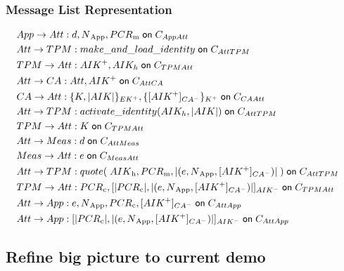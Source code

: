 \documentclass{beamer}
\def \app {App}
\def \att {Att}
\def \ca {CA}
\def \mea {Meas}
\def \tp {TPM}
\def \pmask {PCR\textsubscript{m}}
\def \pcomp {PCR\textsubscript{c}}
\def \evd {d}
\def \eve {e}
\def \cacert {\sign {\public{AIK}}{CA}}
\def \exdata {\hash{(\eve, \nonce{\app}, \cacert ) }}
\def \aikh {AIK_h}
\begin{document}
\begin{frame}
  \frametitle{Message List Representation}
  \begin{small}
  \begin{align*}
  & \sndmsg {\app}{\att} {\evd, \nonce{\app}, \pmask} {\channel {\app \att}}  & \\
  & \sndmsg{\att}{\tp} {make\_and\_load\_identity} {\channel {\att \tp}} & \\
  & \sndmsg{\tp}{\att} {\public{AIK}, \aikh} {\channel {\tp \att}} & \\
  & \sndmsg{\att}{\ca} {\att, \public{AIK}} {\channel {\att \ca}} & \\
  & \sndmsg{\ca}{\att} {\encrypt{K, \hash{AIK}}{EK}, \encrypt{\cacert}{K}} {\channel {\ca \att}}& \\
  & \sndmsg{\att}{\tp} {activate\_identity({\aikh, \hash{AIK})}} {\channel {\att \tp}} & \\
  & \sndmsg{\tp}{\att} {K} {\channel {\tp \att}} & \\
  & \sndmsg{\att}{\mea} {\evd} {\channel {\att \mea}} & \\
  & \sndmsg{\mea}{\att} {\eve} {\channel {\mea \att}} & \\
  & \sndmsg{\att}{\tp} {quote(\;{AIK\textsubscript{h}, \pmask, \exdata}\;)} {\channel {\att \tp}} & \\
  & \sndmsg{\tp}{\att} {\pcomp, \sign{\hash{\pcomp}, \exdata}{AIK}} {\channel {\tp \att}} & \\
  & \sndmsg{\att}{\app} {\eve, \nonce{\app}, \pcomp, \cacert} {\channel {\att \app}} & \\
  & \sndmsg{\att}{\app} {\sign{\hash{\pcomp}, \exdata}{AIK}} {\channel {\att \app}} & 
\end{align*}
\end{small}
\end{frame}

\subsection{Refine big picture to current demo}
\end{document}
